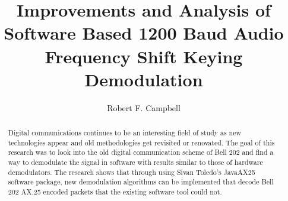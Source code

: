 \documentclass[12pt]{ucthesis}
\begin{document}
\title{Improvements and Analysis of Software Based 1200 Baud Audio Frequency Shift Keying Demodulation}
\author{Robert F. Campbell}
  
 
     
\maketitle

\begin{frontmatter}

\copyrightpage

\committeemembershippage

\begin{abstract}
Digital communications continues to be an interesting field of study as new technologies appear and old methodologies get revisited or renovated. The goal of this research was to look into the old digital communication scheme of Bell 202 and find a way to demodulate the signal in software with results similar to those of hardware demodulators. The research shows that through using Sivan Toledo’s JavaAX25 software package, new demodulation algorithms can be implemented that decode Bell 202 AX.25 encoded packets that the existing software tool could not.
\end{abstract}


\tableofcontents
\listoftables
\listoffigures

\end{frontmatter}














%
%
%
%
%
%
%
\end{document}
